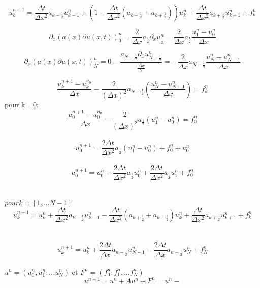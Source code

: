 \documentclass[a4paper,12pt,twoside]{report}
\begin{document}
$$u_k ^{n+1} = \frac{\Delta t}{ \Delta x ^2} a_{k-\frac{1}{2}} u_{k-1} ^n +(1- \frac{\Delta t}{\Delta x^2} (a_{k-\frac{1}{2}} + a_{k+\frac{1}{2}}))u_k ^ n +\frac{\Delta t}{\Delta x^2} a_{k+\frac{1}{2}} u_{k+1} ^n + f_k ^n$$

$$\partial_x(a(x) \partial u(x,t))_0 ^n = \frac{2}{\Delta x} a_{\frac{1}{2}} \partial_x u_{\frac{1}{2}} ^n = \frac{2}{\Delta x} a_{\frac{1}{2}} \frac{u_1 ^n - u_0 ^n}{\Delta x}$$

$$\partial_x(a(x) \partial u(x,t))_N ^n = 0 -\frac{a_{N-\frac{1}{2}} \partial_x u_{N-\frac{1}{2}} ^n}{\frac{\Delta x}{2}} = -\frac{2}{\Delta x} a_{N-\frac{1}{2}} \frac{u_N ^n - u_{N-1}^n}{\Delta x}$$

$$\frac{u_{k} ^{n+1} - u_{k} ^{n_0}}{ \Delta x} - \frac{2}{( \Delta x)^2} a_{N-\frac{1}{2}}(\frac{u_N ^n - u_{N-1}^n}{\Delta x})  = f_k ^n$$
pour k= 0: $$\frac{u_{0} ^{n+1} - u_{0} ^{n_0}}{ \Delta x} - \frac{2}{( \Delta x)^2} a_{\frac{1}{2}}(u_1 ^n - u_0^n)  = f_0 ^n$$ \\

$$u_0 ^{n+1} = \frac{2 \Delta t}{ \Delta x ^2} a_{\frac{1}{2}} (u_1^n -u_0 ^n) + f_0 ^n + u_0 ^n$$ \\
$$u_0 ^{n+1} = u_0 ^{n} - \frac{2 \Delta t}{ \Delta x ^2} a_{\frac{1}{2}} u_0 ^n + \frac{2 \Delta t}{ \Delta x ^2} a_{\frac{1}{2}} u_1 ^n + f_0 ^n$$ \\
\\
$pour k = [1,...N-1]$\\
$$u_k ^{n+1} = u_k ^{n} + \frac{ \Delta t}{ \Delta x ^2} a_{k - \frac{1}{2}} u_{k-1} ^n - \frac{ \Delta t}{ \Delta x ^2} ( a_{k + \frac{1}{2}} +a_{k - \frac{1}{2}}) u_{k} ^n +\frac{ \Delta t}{ \Delta x ^2} a_{k+ \frac{1}{2}} u_{k+1} ^n + f_k ^n$$ \\
\\
$$ u_k ^{n+1} = u_k ^{n} +  \frac{2 \Delta t}{ \Delta x} a_{n - \frac{1}{2}} u_{N-1} ^n -  \frac{2 \Delta t}{ \Delta x} a_{n - \frac{1}{2}} u_{N} ^n + f_N ^n$$\\
$u^n = (u_0 ^n, u_1 ^n, ...u_N ^n) $ et $ F^n = (f_0 ^n, f_1 ^n, ...f_N ^n)$ \\

$$u^{n+1} = u^n + Au^n + F^n = u^n - $$














\smallbreak
\end{document}
